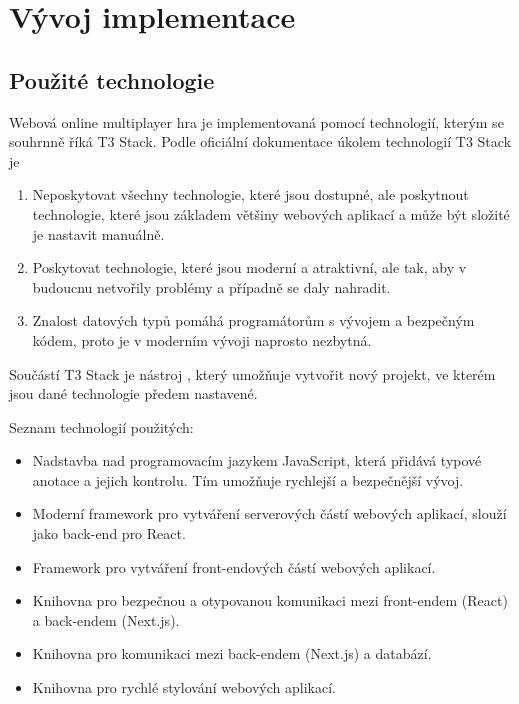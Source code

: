\chapter{Vývoj implementace}

\section{Použité technologie}

Webová online multiplayer hra je implementovaná pomocí technologií, kterým se souhrnně říká T3 Stack. Podle oficiální dokumentace \parencite{t3stack} úkolem technologií T3 Stack je

\begin{enumerate}
    \item {} Neposkytovat všechny technologie, které jsou dostupné, ale poskytnout technologie, které jsou základem většiny webových aplikací a může být složité je nastavit manuálně.
    \item {} Poskytovat technologie, které jsou moderní a atraktivní, ale tak, aby v budoucnu netvořily problémy a případně se daly nahradit.
    \item {} Znalost datových typů pomáhá programátorům s vývojem a bezpečným kódem, proto je v moderním vývoji naprosto nezbytná.
\end{enumerate}


Součástí T3 Stack je nástroj , který umožňuje vytvořit nový projekt, ve kterém jsou dané technologie předem nastavené.

Seznam technologií použitých:
\begin{itemize}
    \item {} Nadstavba nad programovacím jazykem JavaScript, která přidává typové anotace a jejich kontrolu. Tím umožňuje rychlejší a bezpečnější vývoj.
    \item {} Moderní framework pro vytváření serverových částí webových  aplikací, slouží jako back-end pro React.
    \item {} Framework pro vytváření front-endových částí webových aplikací.
    \item {} Knihovna pro bezpečnou a otypovanou komunikaci mezi front-endem (React) a back-endem (Next.js).
    \item {} Knihovna pro komunikaci mezi back-endem (Next.js) a databází.
    \item {} Knihovna pro rychlé stylování webových aplikací.
\end{itemize}

